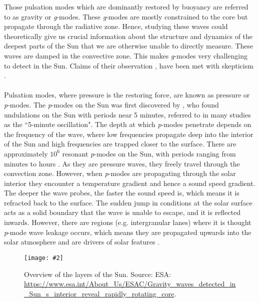 \documentclass[12pt]{ociamthesis}
\newcommand{\mfig}[4]{
  \begin{figure}
  \begin{center}
  \texttt{[image: \#2]}
  \caption{#3}
  \label{#4}
  \end{center}
  \end{figure}}
\newcommand{\np}{\\ \\}
\begin{document}
%
Those pulsation modes which are dominantly restored by buoyancy are referred to as gravity or \textit{g}-modes. These \textit{g}-modes are mostly constrained to the core but propagate through the radiative zone. Hence, studying these waves could theoretically give us crucial information about the structure and dynamics of the deepest parts of the Sun that we are otherwise unable to directly measure. These waves are damped in the convective zone. This makes \textit{g}-modes very challenging to detect in the Sun. Claims of their observation \citep{Garc2007Sci3161591G, Fossat2017AA604A40F, Fossat2018AA612L1F}, have been met with skepticism \citep{Appourchaux2010AARv18197A, Schunker2018SoPh29395S,Appourchaux2019AA624A106A, Scherrer2019ApJ87742S}. \np
%
Pulsation modes, where pressure is the restoring force, are known as pressure or \textit{p}-modes. The \textit{p}-modes on the Sun was first discovered by \cite{Leighton1962ApJ135474L}, who found undulations on the Sun with periods near 5 minutes, referred to in many studies as the ``5-minute oscillation". The depth at which \textit{p}-modes penetrate depends on the frequency of the wave, where low frequencies propagate deep into the interior of the Sun and high frequencies are trapped closer to the surface. There are approximately $10^6$ resonant \textit{p}-modes on the Sun, with periods ranging from minutes to hours \citep{Demarque1999PNAS965356D}. As they are pressure waves, they freely travel through the convection zone. However, when \textit{p}-modes are propagating through the solar interior they encounter a temperature gradient and hence a sound speed gradient. The deeper the wave probes, the faster the sound speed is, which means it is refracted back to the surface. The sudden jump in conditions at the solar surface acts as a solid boundary that the wave is unable to escape, and it is reflected inwards. However, there are regions (e.g. intergranular lanes) where it is thought \textit{p}-mode wave leakage occurs, which means they are propagated upwards into the solar atmosphere and are drivers of solar features \citep{Suematsu1990LNP367211S, Pontieu2004Natur, Pontieu2005ApJ624L61D, Heggland2007ApJ6661277H, Pontieu2004Natur}.
\mfig{0.8}{figures/image10.png}{Overview of the layers of the Sun. Source: ESA: \url{https://www.esa.int/About_Us/ESAC/Gravity_waves_detected_in_Sun_s_interior_reveal_rapidly_rotating_core}.}{on_model}
\end{document}
